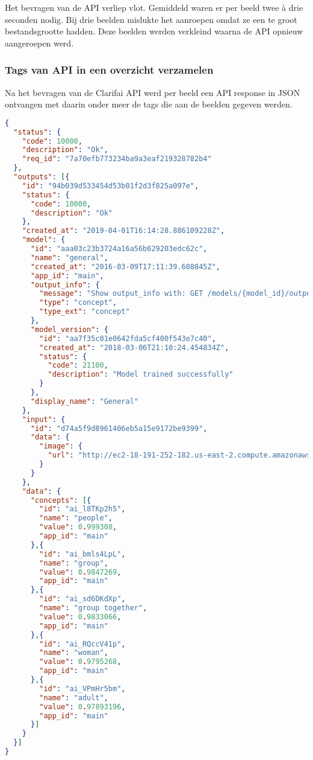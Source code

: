 Het bevragen van de API verliep vlot. Gemiddeld waren er per beeld twee à drie seconden nodig. Bij drie beelden mislukte het aanroepen omdat ze een te groot bestandsgrootte hadden. Deze beelden werden verkleind waarna de API opnieuw aangeroepen werd.

\subsubsection{Tags van API in een overzicht verzamelen}
\label{subsubsec:tags-verzamelen-overzicht}

Na het bevragen van de Clarifai API werd per beeld een API response in JSON ontvangen met daarin onder meer de tags die aan de beelden gegeven werden.

\begin{lstlisting}[language=json,caption=Een ingekorte versie van een ontvangen API response met de tags voor het beeld.]
{
  "status": {
    "code": 10000,
    "description": "Ok",
    "req_id": "7a70efb773234ba9a3eaf219328782b4"
  },
  "outputs": [{
    "id": "94b039d533454d53b01f2d3f825a097e",
    "status": {
      "code": 10000,
      "description": "Ok"
    },
    "created_at": "2019-04-01T16:14:28.886109228Z",
    "model": {
      "id": "aaa03c23b3724a16a56b629203edc62c",
      "name": "general",
      "created_at": "2016-03-09T17:11:39.608845Z",
      "app_id": "main",
      "output_info": {
        "message": "Show output_info with: GET /models/{model_id}/output_info",
        "type": "concept",
        "type_ext": "concept"
      },
      "model_version": {
        "id": "aa7f35c01e0642fda5cf400f543e7c40",
        "created_at": "2018-03-06T21:10:24.454834Z",
        "status": {
       	  "code": 21100,
          "description": "Model trained successfully"
        }
      },
      "display_name": "General"
   	},
    "input": {
      "id": "d74a5f9d8961406eb5a15e9172be9399",
      "data": {
        "image": {
          "url": "http://ec2-18-191-252-182.us-east-2.compute.amazonaws.com:8182/iiif/2/FO-30-00197/full/full/0/default.jpg"
        }
      }
    },
    "data": {
      "concepts": [{
        "id": "ai_l8TKp2h5",
        "name": "people",
        "value": 0.999308,
        "app_id": "main"
      },{
        "id": "ai_bmls4LpL",
        "name": "group",
        "value": 0.9847269,
        "app_id": "main"
      },{
        "id": "ai_sd6DKdXp",
        "name": "group together",
        "value": 0.9833066,
        "app_id": "main"
      },{
        "id": "ai_RQccV41p",
        "name": "woman",
        "value": 0.9795268,
        "app_id": "main"
      },{
        "id": "ai_VPmHr5bm",
        "name": "adult",
        "value": 0.97893196,
        "app_id": "main"
      }]
    }
  }]
}
\end{lstlisting}

